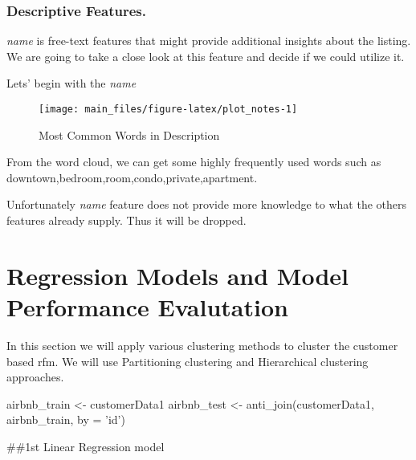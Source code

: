 \hypertarget{descriptive-features.}{%
\subsubsection{Descriptive Features.}\label{descriptive-features.}}

\emph{name } is free-text features that might provide additional
insights about the listing. We are going to take a close look at this
feature and decide if we could utilize it.

Lets' begin with the \emph{name}

\begin{Schunk}
\begin{figure}[H]

{\centering \texttt{[image: main\_files/figure-latex/plot\_notes-1]} 

}

\caption[Most Common Words in Description]{Most Common Words in Description}\label{fig:plot_notes}
\end{figure}
\end{Schunk}

From the word cloud, we can get some highly frequently used words such
as downtown,bedroom,room,condo,private,apartment.

Unfortunately \emph{name} feature does not provide more knowledge to
what the others features already supply. Thus it will be dropped.

\hypertarget{regression-models-and-model-performance-evalutation}{%
\section{Regression Models and Model Performance
Evalutation}\label{regression-models-and-model-performance-evalutation}}

In this section we will apply various clustering methods to cluster the
customer based rfm. We will use Partitioning clustering and Hierarchical
clustering approaches.

\begin{Schunk}
\begin{Sinput}
airbnb_train <- customerData1 %>% sample_frac(.7) %>% filter(price > 0)
airbnb_test  <- anti_join(customerData1, airbnb_train, by = 'id') %>% filter(price > 0)
\end{Sinput}
\end{Schunk}

\#\#1st Linear Regression model

